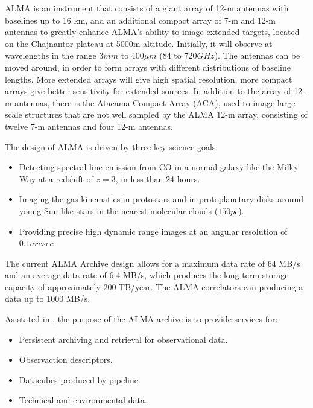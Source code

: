 ALMA is an instrument that consists of a giant array of 12-m antennas with baselines up to 16 km, and an additional compact array of 7-m and 12-m antennas to greatly enhance ALMA's ability to image extended targets, located on the Chajnantor plateau at 5000m altitude. Initially, it will observe at wavelengths in the range $3 mm$ to $400 μm$ ($84$ to $720 GHz$). The antennas can be moved around, in order to form arrays with different distributions of baseline lengths. More extended arrays will give high spatial resolution, more compact arrays give better sensitivity for extended sources. In addition to the array of 12-m antennas, there is the Atacama Compact Array (ACA), used to image large scale structures that are not well sampled by the ALMA 12-m array, consisting of twelve 7-m antennas and four 12-m antennas. 

The design of ALMA is driven by three key science goals:

\begin{itemize}

\item Detecting spectral line emission from CO in a normal galaxy like the Milky Way at a redshift of $z=3$, in less than 24 hours.

\item Imaging the gas kinematics in protostars and in protoplanetary disks around young Sun-like stars in the nearest molecular clouds ($150 pc$).

\item Providing precise high dynamic range images at an angular resolution of $0.1 arcsec$
\end{itemize}

The current ALMA Archive design allows for a maximum data rate of 64 MB/s and an average data rate
of 6.4 MB/s, which produces the long-term storage capacity of approximately 200 TB/year. The
ALMA correlators can producing a data up to 1000 MB/s. 

 
As stated in \cite{Etoka12}, the purpose of the ALMA archive is to provide services for:

\begin{itemize}
\item Persistent archiving and retrieval for observational data.
\item Observaction descriptors.
\item Datacubes produced by pipeline.
\item Technical and environmental data.
\end{itemize}

